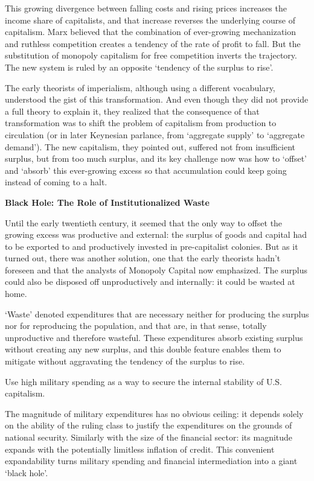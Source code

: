 \documentclass[
]{book}
\begin{document}
This growing divergence between falling costs and rising prices increases the
income share of capitalists, and that increase reverses the underlying course of capitalism.
Marx believed that the combination of ever-growing mechanization and ruthless
competition creates a tendency of the rate of profit to fall. But the substitution of
monopoly capitalism for free competition inverts the trajectory. The new system
is ruled by an opposite `tendency of the surplus to rise'.

The early theorists of imperialism, although using a different vocabulary,
understood the gist of this transformation. And even though they did not provide a full
theory to explain it, they realized that the consequence of that transformation was to shift
the problem of capitalism from production to circulation (or in later Keynesian parlance,
from `aggregate supply' to `aggregate demand'). The new capitalism, they pointed out,
suffered not from insufficient surplus, but from too much surplus, and its key challenge
now was how to `offset' and `absorb' this ever-growing excess so that accumulation could
keep going instead of coming to a halt.

\textbf{Black Hole: The Role of Institutionalized Waste}

Until the early twentieth century, it seemed that the only way to offset the growing excess
was productive and external: the surplus of goods and capital had to be exported to and
productively invested in pre-capitalist colonies. But as it turned out, there was another
solution, one that the early theorists hadn't foreseen and that the analysts of Monopoly
Capital now emphasized. The surplus could also be disposed off unproductively and
internally: it could be wasted at home.

`Waste' denoted expenditures that are
necessary neither for producing the surplus nor for reproducing the population, and that
are, in that sense, totally unproductive and therefore wasteful. These expenditures absorb
existing surplus without creating any new surplus, and this double feature enables them to
mitigate without aggravating the tendency of the surplus to rise.

Use high military spending as a way to
secure the internal stability of U.S. capitalism.

The magnitude of military expenditures has no obvious ceiling: it
depends solely on the ability of the ruling class to justify the expenditures on the grounds
of national security. Similarly with the size of the financial sector: its magnitude expands
with the potentially limitless inflation of credit. This convenient expandability turns
military spending and financial intermediation into a giant `black hole'.
\end{document}
